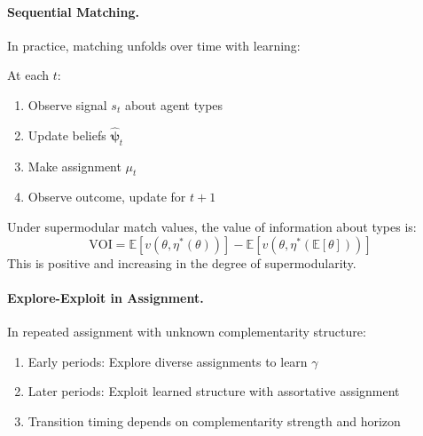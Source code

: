 \paragraph{Sequential Matching.}

In practice, matching unfolds over time with learning:

\begin{definition}
\label{def:dynamic-match}
At each $t$:
\begin{enumerate}
    \item Observe signal $s_t$ about agent types
    \item Update beliefs $\hat{\boldsymbol{\psi}}_t$
    \item Make assignment $\mu_t$
    \item Observe outcome, update for $t+1$
\end{enumerate}
\end{definition}

\begin{proposition}
\label{prop:voi-matching}
Under supermodular match values, the value of information about types is:
\begin{equation}
\text{VOI} = \mathbb{E}[v(\theta, \eta^*(\theta))] - \mathbb{E}[v(\theta, \eta^*(\mathbb{E}[\theta]))]
\end{equation}
This is positive and increasing in the degree of supermodularity.
\end{proposition}

\paragraph{Explore-Exploit in Assignment.}

\begin{proposition}
\label{prop:explore-exploit}
In repeated assignment with unknown complementarity structure:
\begin{enumerate}
    \item Early periods: Explore diverse assignments to learn $\gamma$
    \item Later periods: Exploit learned structure with assortative assignment
    \item Transition timing depends on complementarity strength and horizon
\end{enumerate}
\end{proposition}

